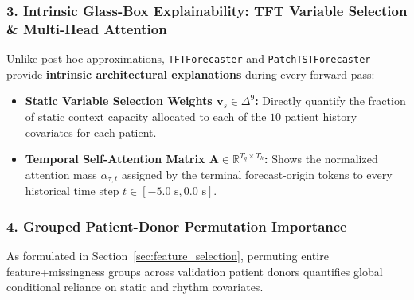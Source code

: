 \documentclass[11pt,a4paper]{article}
\begin{document}
\subsubsection{3. Intrinsic Glass-Box Explainability: TFT Variable Selection \& Multi-Head Attention}
Unlike post-hoc approximations, \texttt{TFTForecaster} and \texttt{PatchTSTForecaster} provide \textbf{intrinsic architectural explanations} during every forward pass:
\begin{itemize}
    \item \textbf{Static Variable Selection Weights $\mathbf{v}_s \in \Delta^{9}$:} Directly quantify the fraction of static context capacity allocated to each of the $10$ patient history covariates for each patient.
    \item \textbf{Temporal Self-Attention Matrix $\mathbf{A} \in \mathbb{R}^{T_q \times T_k}$:} Shows the normalized attention mass $\alpha_{\tau, t}$ assigned by the terminal forecast-origin tokens to every historical time step $t \in [-5.0\text{ s}, 0.0\text{ s}]$.
\end{itemize}

\subsubsection{4. Grouped Patient-Donor Permutation Importance}
As formulated in Section~\ref{sec:feature_selection}, permuting entire feature+missingness groups across validation patient donors quantifies global conditional reliance on static and rhythm covariates.
\end{document}
